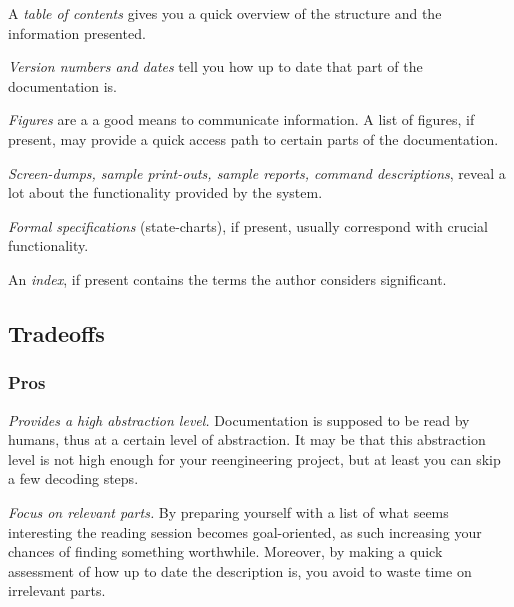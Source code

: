 \documentclass[a4paper,10pt,twoside]{book}
\begin{document}
\begin{bulletlist}
  \item A \emph{table of contents} gives you a quick overview of the structure and the information presented.

  \item \emph{Version numbers and dates} tell you how up to date that part of the documentation is.

  \item \emph{Figures} are a a good means to communicate information. A list of figures, if present, may provide a quick access path to certain parts of the documentation.

  \item \emph{Screen-dumps, sample print-outs, sample reports, command descriptions}, reveal a lot about the functionality provided by the system.

  \item \emph{Formal specifications} (\eg state-charts), if present, usually correspond with crucial functionality.

  \item An \emph{index}, if present contains the terms the author considers significant.
\end{bulletlist}

\subsection*{Tradeoffs}

\subsubsection*{Pros}

\begin{bulletlist}
  \item \emph{Provides a high abstraction level.}
Documentation is supposed to be read by humans, thus at a certain level of abstraction. It may be that this abstraction level is not high enough for your reengineering project, but at least you can skip a few decoding steps.

  \item \emph{Focus on relevant parts.}
By preparing yourself with a list of what seems interesting the reading session becomes goal-oriented, as such increasing your chances of finding something worthwhile. Moreover, by making a quick assessment of how up to date the description is, you avoid to waste time on irrelevant parts.
\end{bulletlist}
\end{document}
